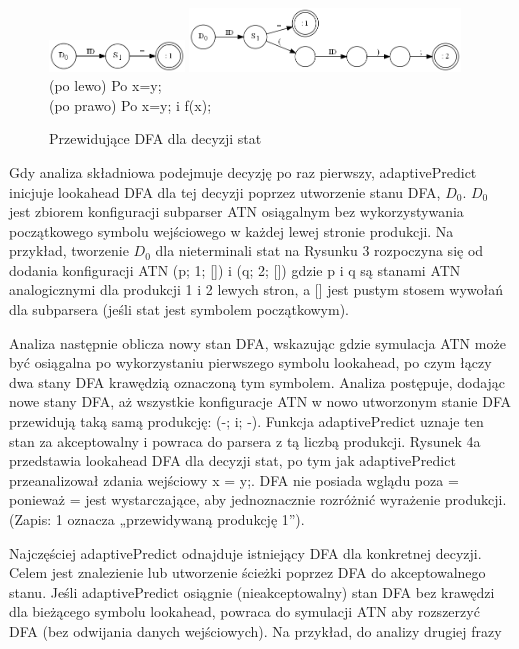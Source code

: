 \begin{figure}[h]
\includegraphics[width=0.32\textwidth]{Figure4a.png}
\includegraphics[width=0.64\textwidth]{Figure4b.png}
\\
(po lewo) Po x=y;\\
(po prawo) Po x=y; i f(x);
\caption{Przewidujące DFA dla decyzji stat}
\end{figure}
\par
Gdy analiza składniowa podejmuje decyzję po raz pierwszy, adaptivePredict
inicjuje lookahead DFA dla tej decyzji poprzez utworzenie stanu DFA, $D_0$.
$D_0$ jest zbiorem konfiguracji subparser ATN osiągalnym bez wykorzystywania
początkowego symbolu wejściowego w każdej lewej stronie produkcji.
Na przykład, tworzenie $D_0$ dla nieterminali stat na Rysunku 3 rozpoczyna się
od dodania konfiguracji ATN (p; 1; []) i (q; 2; []) gdzie p i q są stanami
ATN analogicznymi dla produkcji 1 i 2 lewych stron, a [] jest pustym stosem wywołań dla subparsera
(jeśli stat jest symbolem początkowym).
\par
Analiza następnie oblicza nowy stan DFA, wskazując gdzie symulacja ATN może
być osiągalna po wykorzystaniu pierwszego symbolu lookahead, po czym łączy
dwa stany DFA krawędzią oznaczoną tym symbolem. Analiza postępuje,
dodając nowe stany DFA, aż wszystkie konfiguracje ATN w nowo utworzonym
stanie DFA przewidują taką samą produkcję: (-; i; -).
Funkcja adaptivePredict uznaje ten stan za akceptowalny i powraca do parsera
z tą liczbą produkcji. Rysunek 4a przedstawia lookahead DFA dla decyzji stat,
po tym jak adaptivePredict przeanalizował zdania wejściowy x = y;.
DFA nie posiada wglądu poza = ponieważ = jest wystarczające, aby jednoznacznie
rozróżnić wyrażenie produkcji. (Zapis: 1 oznacza „przewidywaną produkcję 1”).
\par
Najczęściej adaptivePredict odnajduje istniejący DFA dla konkretnej decyzji.
Celem jest znalezienie lub utworzenie ścieżki poprzez DFA do akceptowalnego stanu.
Jeśli adaptivePredict osiągnie (nieakceptowalny) stan DFA bez krawędzi
dla bieżącego symbolu lookahead, powraca do symulacji ATN aby rozszerzyć DFA
(bez odwijania danych wejściowych). Na przykład, do analizy drugiej frazy
